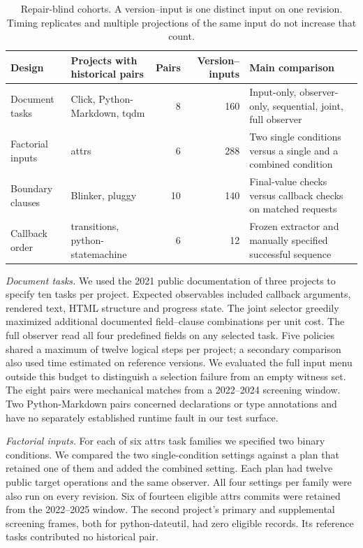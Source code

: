 \documentclass[conference]{IEEEtran}
\begin{document}
\begin{table}[t]
\caption{Repair-blind cohorts. A version--input is one distinct input on one revision. Timing replicates and multiple projections of the same input do not increase that count.}\label{cohorts}
\centering\small
\begin{tabular}{p{}p{}rrp{}}
\hline
Design & Projects with historical pairs & Pairs & Version--inputs & Main comparison\\ \hline
Document tasks & Click, Python-Markdown, tqdm & 8 & 160 & Input-only, observer-only, sequential, joint, full observer\\
Factorial inputs & attrs & 6 & 288 & Two single conditions versus a single and a combined condition\\
Boundary clauses & Blinker, pluggy & 10 & 140 & Final-value checks versus callback checks on matched requests\\
Callback order & transitions, python-statemachine & 6 & 12 & Frozen extractor and manually specified successful sequence\\ \hline
\end{tabular}
\end{table}

\emph{Document tasks.} We used the 2021 public documentation of three projects to specify ten tasks per project. Expected observables included callback arguments, rendered text, HTML structure and progress state. The joint selector greedily maximized additional documented field--clause combinations per unit cost. The full observer read all four predefined fields on any selected task. Five policies shared a maximum of twelve logical steps per project; a secondary comparison also used time estimated on reference versions. We evaluated the full input menu outside this budget to distinguish a selection failure from an empty witness set. The eight pairs were mechanical matches from a 2022--2024 screening window. Two Python-Markdown pairs concerned declarations or type annotations and have no separately established runtime fault in our test surface.

\emph{Factorial inputs.} For each of six attrs task families we specified two binary conditions. We compared the two single-condition settings against a plan that retained one of them and added the combined setting. Each plan had twelve public target operations and the same observer. All four settings per family were also run on every revision. Six of fourteen eligible attrs commits were retained from the 2022--2025 window. The second project's primary and supplemental screening frames, both for python-dateutil, had zero eligible records. Its reference tasks contributed no historical pair.
\end{document}

